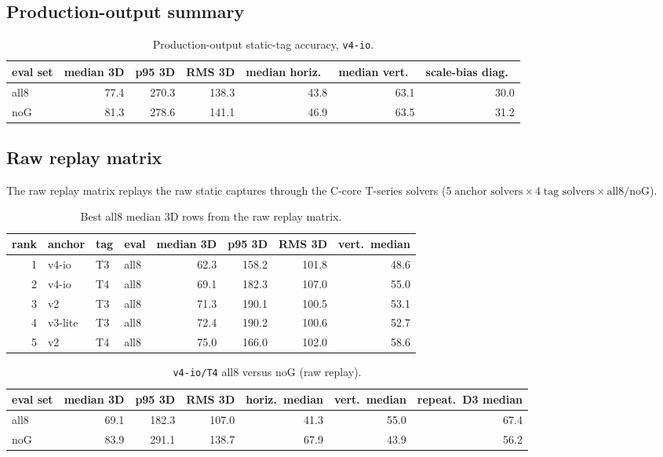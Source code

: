 \documentclass[11pt,a4paper]{article}
\begin{document}
\subsection{Production-output summary}
\begin{table}[h]
\centering
\caption{Production-output static-tag accuracy, \texttt{v4-io}.}
\begin{tabular}{lrrrrrr}
\toprule
eval set & median 3D & p95 3D & RMS 3D & median horiz.\ & median vert.\ & scale-bias diag.\ \\
\midrule
all8 & 77.4 & 270.3 & 138.3 & 43.8 & 63.1 & 30.0 \\
noG  & 81.3 & 278.6 & 141.1 & 46.9 & 63.5 & 31.2 \\
\bottomrule
\end{tabular}
\end{table}

\subsection{Raw replay matrix}
The raw replay matrix replays the raw static captures through the C-core T-series solvers
($5\;\text{anchor solvers} \times 4\;\text{tag solvers} \times \text{all8/noG}$).

\begin{table}[h]
\centering
\caption{Best all8 median 3D rows from the raw replay matrix.}
\begin{tabular}{rlllrrrr}
\toprule
rank & anchor & tag & eval & median 3D & p95 3D & RMS 3D & vert.\ median \\
\midrule
1 & v4-io   & T3 & all8 & 62.3 & 158.2 & 101.8 & 48.6 \\
2 & v4-io   & T4 & all8 & 69.1 & 182.3 & 107.0 & 55.0 \\
3 & v2      & T3 & all8 & 71.3 & 190.1 & 100.5 & 53.1 \\
4 & v3-lite & T3 & all8 & 72.4 & 190.2 & 100.6 & 52.7 \\
5 & v2      & T4 & all8 & 75.0 & 166.0 & 102.0 & 58.6 \\
\bottomrule
\end{tabular}
\end{table}

\begin{table}[h]
\centering
\caption{\texttt{v4-io/T4} all8 versus noG (raw replay).}
\begin{tabular}{lrrrrrr}
\toprule
eval set & median 3D & p95 3D & RMS 3D & horiz.\ median & vert.\ median & repeat.\ D3 median \\
\midrule
all8 & 69.1 & 182.3 & 107.0 & 41.3 & 55.0 & 67.4 \\
noG  & 83.9 & 291.1 & 138.7 & 67.9 & 43.9 & 56.2 \\
\bottomrule
\end{tabular}
\end{table}
\end{document}
